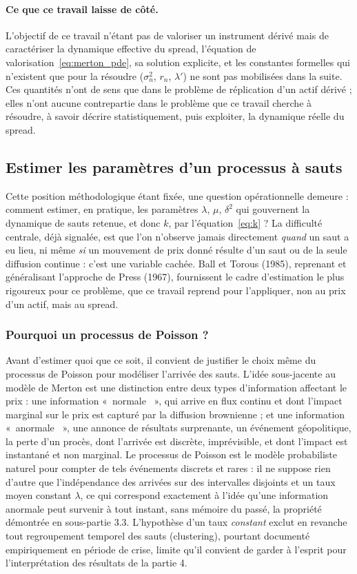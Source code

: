 \documentclass{article}
\providecommand{\og}{«~}
\providecommand{\fg}{~»}
\begin{document}
\paragraph{Ce que ce travail laisse de côté.} L'objectif de ce travail n'étant pas de valoriser un instrument dérivé mais de caractériser la dynamique effective du spread, l'équation de valorisation~\eqref{eq:merton_pde}, sa solution explicite, et les constantes formelles qui n'existent que pour la résoudre ($\sigma_n^2$, $r_n$, $\lambda'$) ne sont pas mobilisées dans la suite. Ces quantités n'ont de sens que dans le problème de réplication d'un actif dérivé ; elles n'ont aucune contrepartie dans le problème que ce travail cherche à résoudre, à savoir décrire statistiquement, puis exploiter, la dynamique réelle du spread.
\subsection{Estimer les paramètres d'un processus à sauts}
Cette position méthodologique étant fixée, une question opérationnelle demeure : comment estimer, en pratique, les paramètres $\lambda$, $\mu$, $\delta^2$ qui gouvernent la dynamique de sauts retenue, et donc $k$, par l'équation~\eqref{eq:k} ? La difficulté centrale, déjà signalée, est que l'on n'observe jamais directement \emph{quand} un saut a eu lieu, ni même \emph{si} un mouvement de prix donné résulte d'un saut ou de la seule diffusion continue : c'est une variable cachée. Ball et Torous (1985), reprenant et généralisant l'approche de Press (1967), fournissent le cadre d'estimation le plus rigoureux pour ce problème, que ce travail reprend pour l'appliquer, non au prix d'un actif, mais au spread.
\subsubsection*{Pourquoi un processus de Poisson ?}
Avant d'estimer quoi que ce soit, il convient de justifier le choix même du processus de Poisson pour modéliser l'arrivée des sauts. L'idée sous-jacente au modèle de Merton est une distinction entre deux types d'information affectant le prix : une information \og normale \fg, qui arrive en flux continu et dont l'impact marginal sur le prix est capturé par la diffusion brownienne ; et une information \og anormale \fg{}, une annonce de résultats surprenante, un événement géopolitique, la perte d'un procès, dont l'arrivée est discrète, imprévisible, et dont l'impact est instantané et non marginal. Le processus de Poisson est le modèle probabiliste naturel pour compter de tels événements discrets et rares : il ne suppose rien d'autre que l'indépendance des arrivées sur des intervalles disjoints et un taux moyen constant $\lambda$, ce qui correspond exactement à l'idée qu'une information anormale peut survenir à tout instant, sans mémoire du passé, la propriété démontrée en sous-partie 3.3. L'hypothèse d'un taux \emph{constant} exclut en revanche tout regroupement temporel des sauts (clustering), pourtant documenté empiriquement en période de crise, limite qu'il convient de garder à l'esprit pour l'interprétation des résultats de la partie 4.
\end{document}
